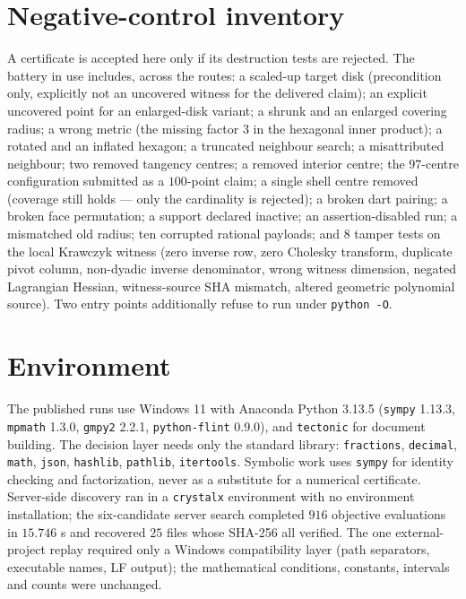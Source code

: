 \section{Negative-control inventory}

A certificate is accepted here only if its destruction tests are rejected. The battery in use
includes, across the routes: a scaled-up target disk (precondition only, explicitly not an uncovered
witness for the delivered claim); an explicit uncovered point for an enlarged-disk variant; a shrunk
and an enlarged covering radius; a wrong metric (the missing factor $3$ in the hexagonal inner
product); a rotated and an inflated hexagon; a truncated neighbour search; a misattributed
neighbour; two removed tangency centres; a removed interior centre; the $97$-centre configuration
submitted as a $100$-point claim; a single shell centre removed (coverage still holds --- only the
cardinality is rejected); a broken dart pairing; a broken face permutation; a support declared
inactive; an assertion-disabled run; a mismatched old radius; ten corrupted rational payloads; and
$8$ tamper tests on the local Krawczyk witness (zero inverse row, zero Cholesky transform, duplicate
pivot column, non-dyadic inverse denominator, wrong witness dimension, negated Lagrangian Hessian,
witness-source SHA mismatch, altered geometric polynomial source). Two entry points additionally
refuse to run under \texttt{python -\allowbreak{}O}.

\section{Environment}

The published runs use Windows 11 with Anaconda Python 3.13.5 (\texttt{sympy} 1.13.3,
\texttt{mpmath} 1.3.0, \texttt{gmpy2} 2.2.1, \texttt{python-\allowbreak{}flint} 0.9.0), and \texttt{tectonic} for
document building. The decision layer needs only the standard library: \texttt{fractions},
\texttt{decimal}, \texttt{math}, \texttt{json}, \texttt{hashlib}, \texttt{pathlib},
\texttt{itertools}. Symbolic work uses \texttt{sympy} for identity checking and factorization, never
as a substitute for a numerical certificate. Server-side discovery ran in a \texttt{crystalx}
environment with no environment installation; the six-candidate server search completed $916$
objective evaluations in $15.746$ s and recovered $25$ files whose SHA-256 all verified. The one
external-project replay required only a Windows compatibility layer (path separators, executable
names, LF output); the mathematical conditions, constants, intervals and counts were unchanged.
